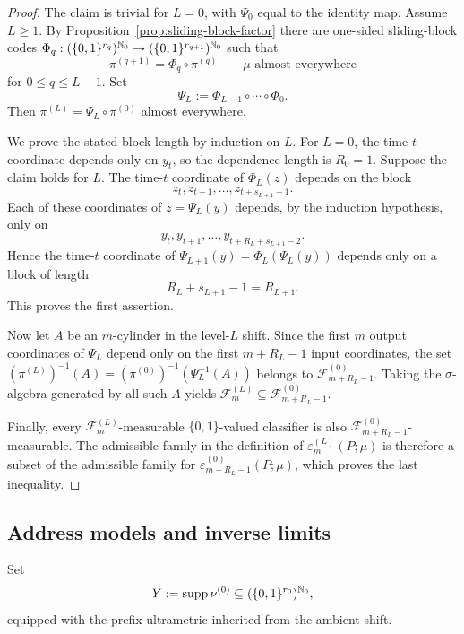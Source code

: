\begin{proof}
The claim is trivial for \(L=0\), with \(\Psi_0\) equal to the identity
map.  Assume \(L\geq 1\).  By Proposition~\ref{prop:sliding-block-factor}
there are one-sided sliding-block codes
\(\Phi_q:(\{0,1\}^{r_q})^{\mathbb{N}_0}
\to(\{0,1\}^{r_{q+1}})^{\mathbb{N}_0}\) such that
\[
  \pi^{(q+1)}=\Phi_q\circ\pi^{(q)}
  \qquad \mu\text{-almost everywhere}
\]
for \(0\leq q\leq L-1\).  Set
\[
  \Psi_L:=\Phi_{L-1}\circ\cdots\circ\Phi_0.
\]
Then \(\pi^{(L)}=\Psi_L\circ\pi^{(0)}\) almost everywhere.

We prove the stated block length by induction on \(L\).  For \(L=0\),
the time-\(t\) coordinate depends only on \(y_t\), so the dependence
length is \(R_0=1\).  Suppose the claim holds for \(L\).  The
time-\(t\) coordinate of \(\Phi_L(z)\) depends on the block
\[
  z_t,z_{t+1},\ldots,z_{t+s_{L+1}-1}.
\]
Each of these coordinates of \(z=\Psi_L(y)\) depends, by the induction
hypothesis, only on
\[
  y_t,y_{t+1},\ldots,y_{t+R_L+s_{L+1}-2}.
\]
Hence the time-\(t\) coordinate of \(\Psi_{L+1}(y)=\Phi_L(\Psi_L(y))\)
depends only on a block of length
\[
  R_L+s_{L+1}-1 = R_{L+1}.
\]
This proves the first assertion.

Now let \(A\) be an \(m\)-cylinder in the level-\(L\) shift.  Since the
first \(m\) output coordinates of \(\Psi_L\) depend only on the first
\(m+R_L-1\) input coordinates, the set
\((\pi^{(L)})^{-1}(A)=(\pi^{(0)})^{-1}(\Psi_L^{-1}(A))\) belongs to
\(\mathcal{F}_{m+R_L-1}^{(0)}\).  Taking the \(\sigma\)-algebra
generated by all such \(A\) yields
\(\mathcal{F}_m^{(L)}\subseteq \mathcal{F}_{m+R_L-1}^{(0)}\).

Finally, every \(\mathcal{F}_m^{(L)}\)-measurable \(\{0,1\}\)-valued
classifier is also \(\mathcal{F}_{m+R_L-1}^{(0)}\)-measurable.  The
admissible family in the definition of
\(\varepsilon_m^{(L)}(P;\mu)\) is therefore a subset of the admissible
family for \(\varepsilon_{m+R_L-1}^{(0)}(P;\mu)\), which proves the last
inequality.
\end{proof}

\subsection{Address models and inverse limits}

Set
\[
  Y:=\operatorname{supp}\nu^{(0)}\subseteq(\{0,1\}^{r_0})^{\mathbb{N}_0},
\]
equipped with the prefix ultrametric inherited from the ambient shift.

